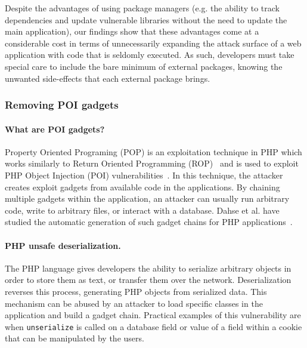 Despite the advantages of using package managers (e.g. the ability to track
dependencies and update vulnerable libraries without the need to update
the main application), our findings show that these advantages come at a
considerable cost in terms of unnecessarily expanding the attack surface of
a web application with code that is seldomly executed. As such, developers
must take special care to include the bare minimum of external packages,
knowing the unwanted side-effects that each external package brings.

\subsubsection{Removing POI gadgets}

\paragraph{What are POI gadgets?}
Property Oriented Programing (POP) is an exploitation technique
in PHP which works similarly to Return Oriented Programming
(ROP)~\cite{shacham2007geometry} and is used to exploit PHP Object Injection
(POI) vulnerabilities~\cite{POI}. In this technique, the attacker creates
exploit gadgets from available code in the applications. By chaining
multiple gadgets within the application, an attacker can usually run
arbitrary code, write to arbitrary files, or interact with a database. Dahse
et al. have studied the automatic generation of such gadget chains for PHP
applications~\cite{Dahse:2014:CRA:2660267.2660363}.

\paragraph{PHP unsafe deserialization.}
The PHP language gives developers the ability to serialize arbitrary objects in
order to store them as text, or transfer them over the network. Deserialization
reverses this process, generating PHP objects from serialized data. This
mechanism can be abused by an attacker to load specific classes in the
application and build a gadget chain. Practical examples of this vulnerability
are when \texttt{unserialize} is called on a database field or value of a
field within a cookie that can be manipulated by the users.

